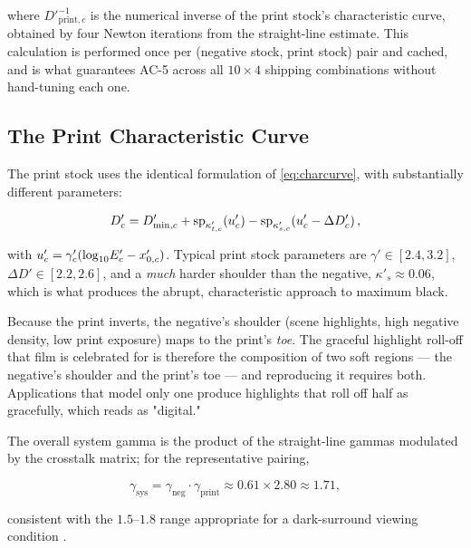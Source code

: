 where $D'^{-1}_{\mathrm{print},c}$ is the numerical inverse of the print stock's
characteristic curve, obtained by four Newton iterations from the straight-line
estimate. This calculation is performed once per (negative stock, print stock)
pair and cached, and is what guarantees AC-5 across all $10 \times 4$ shipping
combinations without hand-tuning each one.

\subsection{The Print Characteristic Curve}

The print stock uses the identical formulation of \eqref{eq:charcurve}, with
substantially different parameters:

\begin{equation}
D'_c = D'_{\min,c} + \mathrm{sp}_{\kappa'_{t,c}}\!\left(u'_c\right) - \mathrm{sp}_{\kappa'_{s,c}}\!\left(u'_c - \Delta D'_c\right),
\label{eq:printcurve}
\end{equation}

with $u'_c = \gamma'_c(\log_{10}\!E'_c - x'_{0,c})$. Typical print stock parameters
are $\gamma' \in [2.4, 3.2]$, $\Delta D' \in [2.2, 2.6]$, and a
\emph{much} harder shoulder than the negative, $\kappa'_s \approx 0.06$, which
is what produces the abrupt, characteristic approach to maximum black.

Because the print inverts, the negative's shoulder (scene highlights, high
negative density, low print exposure) maps to the print's \emph{toe}. The
graceful highlight roll-off that film is celebrated for is therefore the
composition of two soft regions --- the negative's shoulder and the print's toe
--- and reproducing it requires both. Applications that model only one produce
highlights that roll off half as gracefully, which reads as "digital."

The overall system gamma is the product of the straight-line gammas modulated by
the crosstalk matrix; for the representative pairing,

\begin{equation}
\gamma_{\mathrm{sys}} = \gamma_{\mathrm{neg}} \cdot \gamma_{\mathrm{print}} \approx 0.61 \times 2.80 \approx 1.71,
\end{equation}

consistent with the $1.5$--$1.8$ range appropriate for a dark-surround viewing
condition \cite{hunt2004}.

